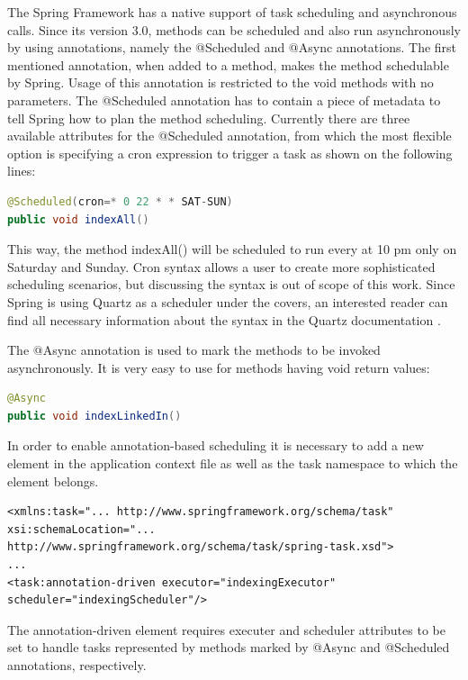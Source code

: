 \documentclass[12pt, oneside, a4paper]{book}
\begin{document}
The Spring Framework has a native support of task scheduling and asynchronous
calls. Since its version 3.0, methods can be scheduled and also run
asynchronously by using annotations, namely the @Scheduled and @Async
annotations. The first mentioned annotation, when added to a method,
makes the method schedulable by Spring. Usage of this annotation is
restricted to the void methods with no parameters. The @Scheduled
annotation has to contain a piece of metadata to tell Spring how to
plan the method scheduling. Currently there are three available attributes
for the @Scheduled annotation, from which the most flexible option
is specifying a cron expression to trigger a task as shown on the
following lines:

\begin{lstlisting}[language=Java]
@Scheduled(cron=* 0 22 * * SAT-SUN)
public void indexAll()
\end{lstlisting}


This way, the method indexAll() will be scheduled to run every at
10 pm only on Saturday and Sunday. Cron syntax allows a user to create
more sophisticated scheduling scenarios, but discussing the syntax
is out of scope of this work. Since Spring is using Quartz as a scheduler
under the covers, an interested reader can find all necessary information
about the syntax in the Quartz documentation \cite{QuartzDoc}.


The @Async annotation is used to mark the methods to be invoked asynchronously.
It is very easy to use for methods having void return values:

\begin{lstlisting}[language=Java]
@Async
public void indexLinkedIn()
\end{lstlisting}


In order to enable annotation-based scheduling it is necessary to
add a new element in the application context file as well as the task
namespace to which the element belongs.

\begin{lstlisting}
<xmlns:task="... http://www.springframework.org/schema/task" 
xsi:schemaLocation="... http://www.springframework.org/schema/task/spring-task.xsd">
...
<task:annotation-driven executor="indexingExecutor" scheduler="indexingScheduler"/>
\end{lstlisting}


The annotation-driven element requires executer and scheduler attributes
to be set to handle tasks represented by methods marked by @Async
and @Scheduled annotations, respectively.
\end{document}
